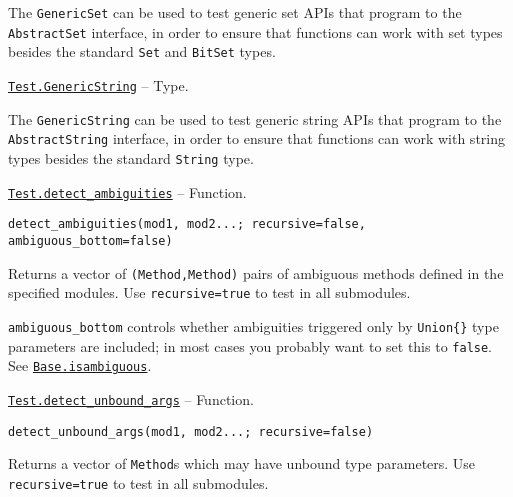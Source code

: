 \begin{adjustwidth}{2em}{0pt}

The \texttt{GenericSet} can be used to test generic set APIs that program to the \texttt{AbstractSet} interface, in order to ensure that functions can work with set types besides the standard \texttt{Set} and \texttt{BitSet} types.



\end{adjustwidth}
\hypertarget{5384256369701360917}{}
\hyperlink{5384256369701360917}{\texttt{Test.GenericString}}  -- {Type.}

\begin{adjustwidth}{2em}{0pt}

The \texttt{GenericString} can be used to test generic string APIs that program to the \texttt{AbstractString} interface, in order to ensure that functions can work with string types besides the standard \texttt{String} type.



\end{adjustwidth}
\hypertarget{9992450569011942205}{}
\hyperlink{9992450569011942205}{\texttt{Test.detect\_ambiguities}}  -- {Function.}

\begin{adjustwidth}{2em}{0pt}


\begin{verbatim}
detect_ambiguities(mod1, mod2...; recursive=false, ambiguous_bottom=false)
\end{verbatim}

Returns a vector of \texttt{(Method,Method)} pairs of ambiguous methods defined in the specified modules. Use \texttt{recursive=true} to test in all submodules.

\texttt{ambiguous\_bottom} controls whether ambiguities triggered only by \texttt{Union\{\}} type parameters are included; in most cases you probably want to set this to \texttt{false}. See \hyperlink{12251716405122065233}{\texttt{Base.isambiguous}}.



\end{adjustwidth}
\hypertarget{10243526008254592310}{}
\hyperlink{10243526008254592310}{\texttt{Test.detect\_unbound\_args}}  -- {Function.}

\begin{adjustwidth}{2em}{0pt}


\begin{verbatim}
detect_unbound_args(mod1, mod2...; recursive=false)
\end{verbatim}

Returns a vector of \texttt{Method}s which may have unbound type parameters. Use \texttt{recursive=true} to test in all submodules.



\end{adjustwidth}



